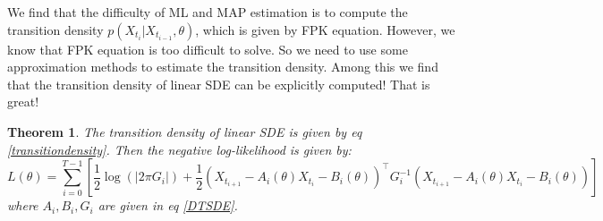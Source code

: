 \documentclass{article}
\newtheorem{theorem}{Theorem}
\begin{document}
We find that the difficulty of ML and MAP estimation is to compute the transition density $p(X_{t_i}|X_{t_{i-1}}, \theta)$, which is given by FPK equation. 
However, we know that FPK equation is too difficult to solve. So we need to use some approximation methods to estimate the transition density.
Among this we find that the transition density of linear SDE can be explicitly computed! That is great!
\begin{theorem}
    The transition density of linear SDE is given by eq \ref{transitiondensity}. Then the negative log-likelihood is given by:
    \begin{equation}
        L(\theta) = \sum_{i=0}^{T - 1} \left[\frac{1}{2}\log(|2\pi G_i|)+\frac{1}{2}(X_{t_{i+1}} - A_i(\theta)X_{t_i} - B_i(\theta))^\top G_i^{-1}(X_{t_{i+1}} - A_i(\theta)X_{t_i} - B_i(\theta))\right]
    \end{equation}
    where $A_i, B_i, G_i$ are given in eq \ref{DTSDE}.
\end{theorem}
\end{document}
